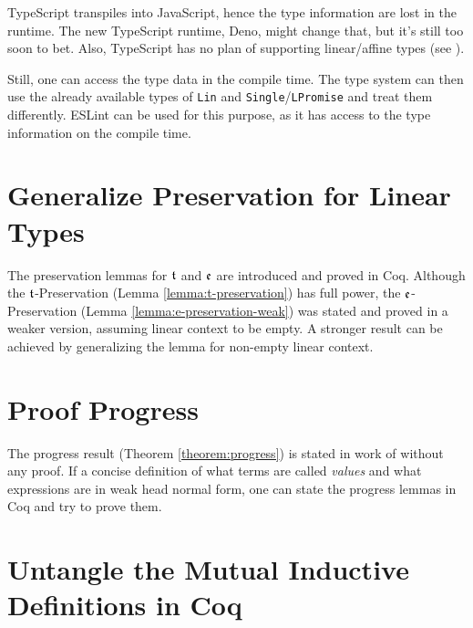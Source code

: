 TypeScript transpiles into JavaScript, hence the type information are lost in the runtime. The new TypeScript runtime, Deno, might change that, but it's still too soon to bet. Also, TypeScript has no plan of supporting linear/affine types (see \cite{typescript-affine}).

Still, one can access the type data in the compile time. The type system can then use the already available types of \texttt{Lin} and \texttt{Single}/\texttt{LPromise} and treat them differently. ESLint can be used for this purpose, as it has access to the type information on the compile time.

\section{Generalize Preservation for Linear Types}

The preservation lemmas for $\mathfrak{t}$ and $\mathfrak{e}$ are introduced and proved in Coq. Although the $\mathfrak{t}$-Preservation (Lemma \ref{lemma:t-preservation}) has full power, the $\mathfrak{e}$-Preservation (Lemma \ref{lemma:e-preservation-weak}) was stated and proved in a weaker version, assuming linear context to be empty. A stronger result can be achieved by generalizing the lemma for non-empty linear context.

\section{Proof Progress}

The progress result (Theorem \ref{theorem:progress}) is stated in work of \cite{Paykin2016TheEO} without any proof. If a concise definition of what terms are called \textit{values} and what expressions are in weak head normal form, one can state the progress lemmas in Coq and try to prove them.

\section{Untangle the Mutual Inductive Definitions in Coq}

